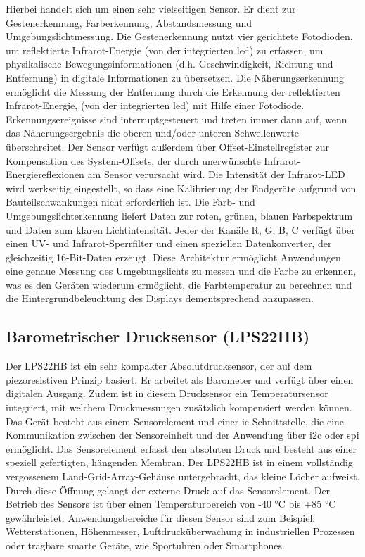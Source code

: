 Hierbei handelt sich um einen sehr vielseitigen Sensor. Er dient zur Gestenerkennung, Farberkennung, Abstandsmessung und Umgebungslichtmessung. Die Gestenerkennung nutzt vier gerichtete Fotodioden, um reflektierte Infrarot-Energie (von der integrierten \ac{led}) zu erfassen, um physikalische Bewegungsinformationen (d.h. Geschwindigkeit, Richtung und Entfernung) in digitale Informationen zu übersetzen. Die Näherungserkennung ermöglicht die Messung der Entfernung durch die Erkennung der reflektierten Infrarot-Energie, (von der integrierten \ac{led}) mit Hilfe einer Fotodiode. Erkennungsereignisse sind interruptgesteuert und treten immer dann auf, wenn das Näherungsergebnis die oberen und/oder unteren Schwellenwerte überschreitet. Der Sensor verfügt außerdem über Offset-Einstellregister zur Kompensation des System-Offsets, der durch unerwünschte Infrarot-Energiereflexionen am Sensor verursacht wird. Die Intensität der Infrarot-LED wird werkseitig eingestellt, so dass eine Kalibrierung der Endgeräte aufgrund von Bauteilschwankungen nicht erforderlich ist. Die Farb- und Umgebungslichterkennung liefert Daten zur roten, grünen, blauen Farbspektrum und Daten zum klaren Lichtintensität. Jeder der Kanäle R, G, B, C verfügt über einen UV- und Infrarot-Sperrfilter und einen speziellen Datenkonverter, der gleichzeitig 16-Bit-Daten erzeugt. Diese Architektur ermöglicht Anwendungen eine genaue Messung des Umgebungslichts zu messen und die Farbe zu erkennen, was es den Geräten wiederum ermöglicht, die Farbtemperatur zu berechnen und die Hintergrundbeleuchtung des Displays dementsprechend anzupassen.\cite{AT.2015}\cite{Ard.2024}
	
\subsection{Barometrischer Drucksensor (LPS22HB)}

Der LPS22HB ist ein sehr kompakter Absolutdrucksensor, der auf dem piezoresistiven Prinzip basiert. Er arbeitet als Barometer und verfügt über einen digitalen Ausgang. Zudem ist in diesem Drucksensor ein Temperatursensor integriert, mit welchem Druckmessungen zusätzlich kompensiert werden können. Das Gerät besteht aus einem Sensorelement und einer \ac{ic}-Schnittstelle, die eine Kommunikation zwischen der Sensoreinheit und der Anwendung über \ac{i2c} oder \ac{spi} ermöglicht. Das Sensorelement erfasst den absoluten Druck und besteht aus einer speziell gefertigten, hängenden Membran. Der LPS22HB ist in einem vollständig vergossenem Land-Grid-Array-Gehäuse untergebracht, das kleine Löcher aufweist. Durch diese Öffnung gelangt der externe Druck auf das Sensorelement. Der Betrieb des Sensors ist über einen Temperaturbereich von -40 °C bis +85 °C gewährleistet. \cite{STM2.2017}\cite{Ard.2024}
Anwendungsbereiche für diesen Sensor sind zum Beispiel: Wetterstationen, Höhenmesser, Luftdrucküberwachung in industriellen Prozessen oder tragbare smarte Geräte, wie Sportuhren oder Smartphones.
	
